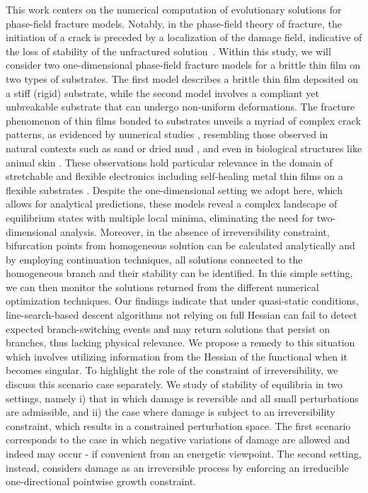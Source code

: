 This work centers on the numerical computation of evolutionary solutions for phase-field fracture models. Notably, in the phase-field theory of fracture, the initiation of a crack is preceded by a localization of the damage field, indicative of the loss of stability of the unfractured solution~\cite{Baldelli2014-ho,Kuhn2015-rt,Baldelli2021-gc,Harandi2023-cd}. Within this study, we will consider two one-dimensional phase-field fracture models for a brittle thin film on two types of substrates. The first model describes a brittle thin film deposited on a stiff (rigid) substrate, while the second model involves a compliant yet unbreakable substrate that can undergo non-uniform deformations. The fracture phenomenon of thin films bonded to substrates unveils a myriad of complex crack patterns, as evidenced by numerical studies \cite{Baldelli2014-ho,Alessi2019-bx,Hu2020-nt,Salman2021-mn,Baldelli2021-gc}, resembling those observed in natural contexts such as sand or dried mud \cite{Goehring2010-xz}, and even in biological structures like animal skin \cite{Qin2014-wz}. These observations hold particular relevance in the domain of stretchable and flexible electronics \cite{Faurie2019-to,Godard2022-ss} including  self-healing metal thin films on a flexible substrates \cite{Trost2024-ca}.  Despite the one-dimensional setting we adopt here, which allows for analytical predictions, these models reveal a complex landscape of equilibrium states with multiple local minima, eliminating the need for two-dimensional analysis. Moreover, in the absence of irreversibility constraint, bifurcation points from homogeneous solution can be calculated analytically and by employing continuation techniques, all solutions connected to the homogeneous branch and their stability can be identified. 
In this simple setting, we can then monitor the solutions returned from  the different  numerical optimization techniques. Our findings indicate that under quasi-static conditions, line-search-based descent algorithms not relying on full Hessian can fail to detect expected branch-switching events and may return solutions that persist on  branches, thus lacking physical relevance. 
We propose a remedy to this situation which involves utilizing information from the Hessian of the functional when it becomes singular. 
To highlight the role of the constraint of irreversibility, we discuss this scenario case separately.
We study of stability of equilibria in two settings, namely i) that in which damage is reversible and all small perturbations are admissible, and ii) the case where damage is subject to an irreversibility constraint, which results in a constrained perturbation space. The first scenario corresponds to the case in which negative variations of damage are allowed and indeed may occur - if convenient from an energetic viewpoint. The second setting, instead, considers damage as an irreversible process by enforcing an irreducible one-directional pointwise growth constraint.

